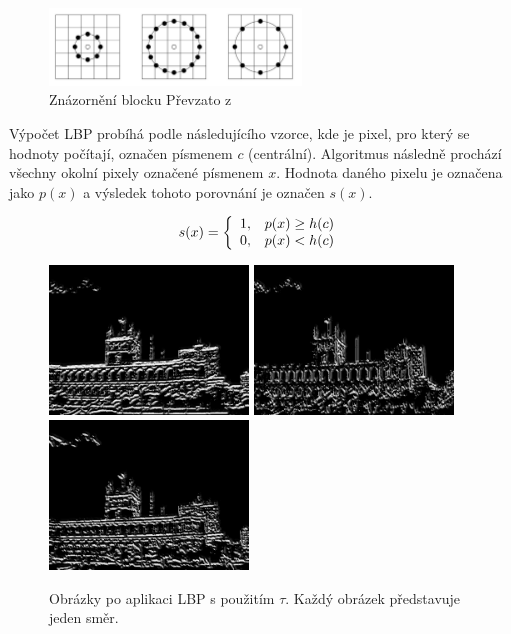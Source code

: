 \documentclass[czech,BP]{thesiskiv}
\begin{document}
\begin{figure}[H]
		\centering
		\includegraphics[width=253px]{./img/znazorneni_lbp.png}	
		\caption{Znázornění blocku Převzato z \cite{SrovnaniDeskriptoru}}
\end{figure}

\par Výpočet LBP probíhá podle následujícího vzorce, kde je pixel, pro který se hodnoty počítají, označen písmenem $c$ (centrální). Algoritmus následně prochází všechny okolní pixely označené písmenem  $x$. Hodnota daného pixelu je označena jako $p(x)$ a výsledek tohoto porovnání je označen $s(x)$.

\begin{displaymath} 
	\label{asd2} 
		    s(x) = \left\{ \begin{array}{r@{\quad}c}
    		1, & p(x) \geq h(c) \\
    		0, & p(x) < h(c) \\ \end{array} \right. 
\end{displaymath}

\begin{figure}[ht]
	\centering
	\includegraphics[width=150pt]{./img/lbp1_tau.jpg}
	\includegraphics[width=150pt]{./img/lbp2_tau.jpg}
	\includegraphics[width=150pt]{./img/lbp3_tau.jpg}
	\caption{Obrázky po aplikaci LBP s použitím $\tau$. Každý obrázek představuje jeden směr.}
\end{figure}
\end{document}
